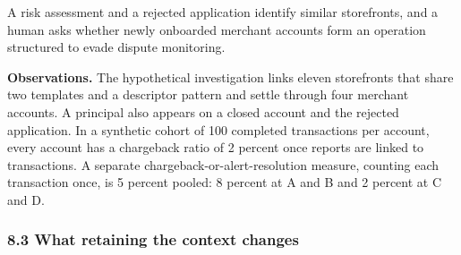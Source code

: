 \documentclass[
  11pt,
]{article}
\begin{document}
A risk assessment and a rejected application identify similar
storefronts, and a human asks whether newly onboarded merchant accounts
form an operation structured to evade dispute monitoring.

\textbf{Observations.} The hypothetical investigation links eleven
storefronts that share two templates and a descriptor pattern and settle
through four merchant accounts. A principal also appears on a closed
account and the rejected application. In a synthetic cohort of 100
completed transactions per account, every account has a chargeback ratio
of 2 percent once reports are linked to transactions. A separate
chargeback-or-alert-resolution measure, counting each transaction once,
is 5 percent pooled: 8 percent at A and B and 2 percent at C and D.

\hypertarget{what-retaining-the-context-changes}{%
\subsubsection{8.3 What retaining the context
changes}\label{what-retaining-the-context-changes}}
\end{document}
